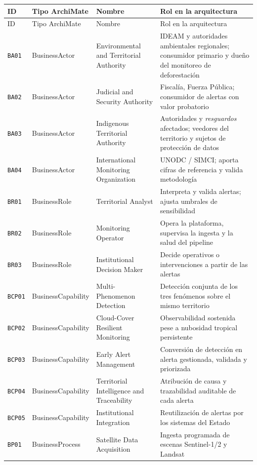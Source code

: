 \documentclass{article}
\begin{document}
{\small
\begin{longtable}{@{}L{0.40in}L{1.35in}L{1.42in}L{2.77in}@{}}
\toprule
ID & Tipo ArchiMate & Nombre & Rol en la arquitectura \\
\midrule
\endfirsthead
\toprule
ID & Tipo ArchiMate & Nombre & Rol en la arquitectura \\
\midrule
\endhead
\bottomrule
\endlastfoot
\texttt{BA01} & BusinessActor & Environmental and Territorial Authority & IDEAM y autoridades ambientales regionales; consumidor primario y dueño del monitoreo de deforestación \\
\texttt{BA02} & BusinessActor & Judicial and Security Authority & Fiscalía, Fuerza Pública; consumidor de alertas con valor probatorio \\
\texttt{BA03} & BusinessActor & Indigenous Territorial Authority & Autoridades y \emph{resguardos} afectados; veedores del territorio y sujetos de protección de datos \\
\texttt{BA04} & BusinessActor & International Monitoring Organization & UNODC / SIMCI; aporta cifras de referencia y valida metodología \\
\texttt{BR01} & BusinessRole & Territorial Analyst & Interpreta y valida alertas; ajusta umbrales de sensibilidad \\
\texttt{BR02} & BusinessRole & Monitoring Operator & Opera la plataforma, supervisa la ingesta y la salud del pipeline \\
\texttt{BR03} & BusinessRole & Institutional Decision Maker & Decide operativos o intervenciones a partir de las alertas \\
\texttt{BCP01} & BusinessCapability & Multi-Phenomenon Detection & Detección conjunta de los tres fenómenos sobre el mismo territorio \\
\texttt{BCP02} & BusinessCapability & Cloud-Cover Resilient Monitoring & Observabilidad sostenida pese a nubosidad tropical persistente \\
\texttt{BCP03} & BusinessCapability & Early Alert Management & Conversión de detección en alerta gestionada, validada y priorizada \\
\texttt{BCP04} & BusinessCapability & Territorial Intelligence and Traceability & Atribución de causa y trazabilidad auditable de cada alerta \\
\texttt{BCP05} & BusinessCapability & Institutional Integration & Reutilización de alertas por los sistemas del Estado \\
\texttt{BP01} & BusinessProcess & Satellite Data Acquisition & Ingesta programada de escenas Sentinel-1/2 y Landsat \\

\end{longtable}}
\end{document}
